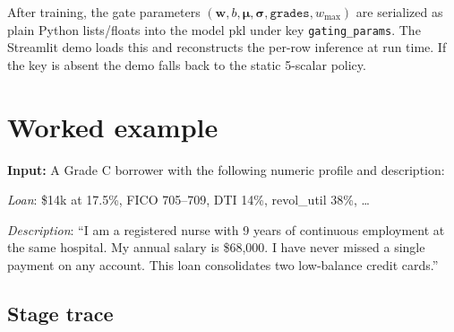 \documentclass[11pt,a4paper]{article}
\begin{document}
After training, the gate parameters $(\mathbf{w}, b, \boldsymbol{\mu},
\boldsymbol{\sigma}, \texttt{grades}, w_{\max})$ are serialized as plain
Python lists/floats into the model pkl under key
\texttt{gating\_params}. The Streamlit demo loads this and reconstructs
the per-row inference at run time. If the key is absent the demo falls
back to the static 5-scalar policy.

\section{Worked example}
\label{sec:example}

\textbf{Input:} A Grade C borrower with the following numeric profile and
description:

\begin{tcolorbox}[colback=codebg,colframe=gray!50,boxrule=0.5pt]
\textit{Loan}: \$14k at 17.5\%, FICO 705--709, DTI 14\%, revol\_util 38\%, \ldots

\textit{Description}: ``I am a registered nurse with 9 years of continuous
employment at the same hospital. My annual salary is \$68,000. I have never
missed a single payment on any account. This loan consolidates two low-balance
credit cards.''
\end{tcolorbox}

\subsection{Stage trace}
\end{document}
